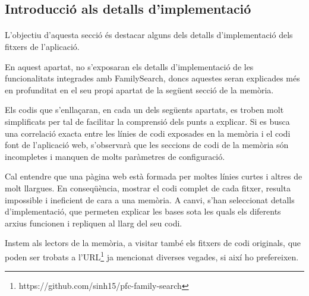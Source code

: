 \subsection{Introducció als detalls d'implementació}

    \paragraph{}
    L'objectiu d'aquesta secció és destacar alguns dels detalls d'implementació dels fitxers de l'aplicació.

    En aquest apartat, no s'exposaran els detalls d'implementació de les funcionalitats integrades amb FamilySearch, doncs aquestes seran explicades més en profunditat en el seu propi apartat de la següent secció de la memòria.

    Els codis que s'enllaçaran, en cada un dels següents apartats, es troben molt simplificats per tal de facilitar la comprensió dels punts a explicar. Si es busca una correlació exacta entre les línies de codi exposades en la memòria i el codi font de l'aplicació web, s'observarà que les seccions de codi de la memòria són incompletes i manquen de molts paràmetres de configuració.

    Cal entendre que una pàgina web està formada per moltes línies curtes i altres de molt llargues. En conseqüència, mostrar el codi complet de cada fitxer, resulta impossible i ineficient de cara a una memòria. A canvi, s'han seleccionat detalls d'implementació, que permeten explicar les bases sota les quals els diferents arxius funcionen i repliquen al llarg del seu codi.

    Instem als lectors de la memòria, a visitar també els fitxers de codi originals, que poden ser trobats a l'URL\footnote{https://github.com/sinh15/pfc-family-search} ja mencionat diverses vegades, si així ho prefereixen.
